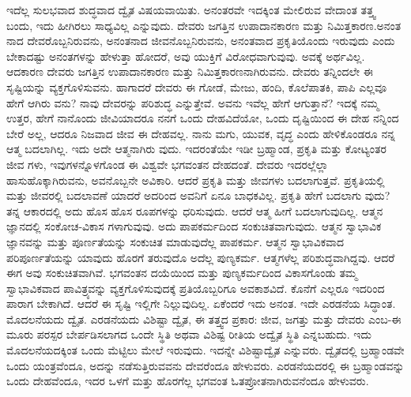 ಇದೆಲ್ಲ ಸುಲಭವಾದ ಶುದ್ಧವಾದ ದ್ವೈತ ವಿಷಯವಾಯಿತು. ಅನಂತರವೇ ಇದಕ್ಕಿಂತ ಮೇಲಿರುವ ವೇದಾಂತ ತತ್ತ್ವ ಬಂದು, ಇದು ಹೀಗಿರಲು ಸಾಧ್ಯವಿಲ್ಲ ಎನ್ನುವುದು. ದೇವರು ಜಗತ್ತಿನ ಉಪಾದಾನಕಾರಣ ಮತ್ತು ನಿಮಿತ್ತಕಾರಣ.ಅನಂತ ನಾದ ದೇವರೊಬ್ಬನಿರುವನು, ಅನಂತನಾದ ಜೀವನೊಬ್ಬನಿರುವನು, ಅನಂತವಾದ ಪ್ರಕೃತಿಯೊಂದು ಇರುವುದು ಎಂದು ಬೇಕಾದಷ್ಟು ಅನಂತಗಳನ್ನು ಹೇಳುತ್ತಾ ಹೋದರೆ, ಅವು ಯುಕ್ತಿಗೆ ವಿರೋಧವಾಗುವುವು. ಅವಕ್ಕೆ ಅರ್ಥವಿಲ್ಲ. ಆದಕಾರಣ ದೇವರು ಜಗತ್ತಿನ ಉಪಾದಾನಕಾರಣ ಮತ್ತು ನಿಮಿತ್ತಕಾರಣನಾಗಿರುವನು. ದೇವರು ತನ್ನಿಂದಲೇ ಈ ಸೃಷ್ಟಿಯನ್ನು ವ್ಯಕ್ತಗೊಳಿಸುವನು. ಹಾಗಾದರೆ ದೇವರು ಈ ಗೋಡೆ, ಮೇಜು, ಹಂದಿ, ಕೊಲೆಪಾತಕಿ, ಪಾಪಿ ಎಲ್ಲವೂ ಹೇಗೆ ಆಗಿರು ವನು? ನಾವು ದೇವರನ್ನು ಪರಿಶುದ್ಧ ಎನ್ನುತ್ತೇವೆ. ಅವನು ಇವೆಲ್ಲ ಹೇಗೆ ಆಗುತ್ತಾನೆ? ಇದಕ್ಕೆ ನಮ್ಮ ಉತ್ತರ, ಹೇಗೆ ನಾನೊಂದು ಜೀವಿಯಾದರೂ ನನಗೆ ಒಂದು ದೇಹವಿದೆಯೋ, ಒಂದು ದೃಷ್ಟಿಯಿಂದ ಈ ದೇಹ ನನ್ನಿಂದ ಬೇರೆ ಅಲ್ಲ, ಆದರೂ ನಿಜವಾದ ಜೀವ ಈ ದೇಹವಲ್ಲ. ನಾನು ಮಗು, ಯುವಕ, ವೃದ್ಧ ಎಂದು ಹೇಳಿಕೊಂಡರೂ ನನ್ನ ಆತ್ಮ ಬದಲಾಗಿಲ್ಲ. ಇದು ಅದೇ ಆತ್ಮನಾಗಿರು ವುದು. ಇದರಂತೆಯೇ ಇಡೀ ಬ್ರಹ್ಮಾಂಡ, ಪ್ರಕೃತಿ ಮತ್ತು ಕೋಟ್ಯಂತರ ಜೀವ ಗಳು, ಇವುಗಳನ್ನೊಳಗೊಂಡ ಈ ವಿಶ್ವವೇ ಭಗವಂತನ ದೇಹದಂತೆ. ದೇವರು ಇದರಲ್ಲೆಲ್ಲಾ ಹಾಸುಹೊಕ್ಕಾಗಿರುವನು, ಅವನೊಬ್ಬನೇ ಅವಿಕಾರಿ. ಆದರೆ ಪ್ರಕೃತಿ ಮತ್ತು ಜೀವಗಳು ಬದಲಾಗುತ್ತವೆ. ಪ್ರಕೃತಿಯಲ್ಲಿ ಮತ್ತು ಜೀವರಲ್ಲಿ ಬದಲಾವಣೆ ಯಾದರೆ ಅದರಿಂದ ಅವನಿಗೆ ಏನೂ ಬಾಧಕವಿಲ್ಲ. ಪ್ರಕೃತಿ ಹೇಗೆ ಬದಲಾಗು ವುದು? ತನ್ನ ಆಕಾರದಲ್ಲಿ ಅದು ಹೊಸ ಹೊಸ ರೂಪಗಳನ್ನು ಧರಿಸುವುದು. ಆದರೆ ಆತ್ಮ ಹೀಗೆ ಬದಲಾಗುವುದಿಲ್ಲ. ಆತ್ಮನ ಜ್ಞಾನದಲ್ಲಿ ಸಂಕೋಚ-ವಿಕಾಸ ಗಳಾಗುವುವು. ಅದು ಪಾಪಕರ್ಮದಿಂದ ಸಂಕುಚಿತವಾಗುವುದು. ಆತ್ಮನ ಸ್ವಾಭಾವಿಕ ಜ್ಞಾನವನ್ನು ಮತ್ತು ಪೂರ್ಣತೆಯನ್ನು ಸಂಕುಚಿತ ಮಾಡುವುದೆಲ್ಲ ಪಾಪಕರ್ಮ. ಆತ್ಮನ ಸ್ವಾಭಾವಿಕವಾದ ಪರಿಪೂರ್ಣತೆಯನ್ನು ಯಾವುದು ಹೊರಗೆ ತರುವುದೊ ಅದೆಲ್ಲ ಪುಣ್ಯಕರ್ಮ. ಆತ್ಮಗಳೆಲ್ಲ ಪರಿಶುದ್ಧವಾಗಿದ್ದವು. ಆದರೆ ಈಗ ಅವು ಸಂಕುಚಿತವಾಗಿವೆ. ಭಗವಂತನ ದಯೆಯಿಂದ ಮತ್ತು ಪುಣ್ಯಕರ್ಮದಿಂದ ವಿಕಾಸಗೊಂಡು ತಮ್ಮ ಸ್ವಾಭಾವಿಕವಾದ ಪಾವಿತ್ರ್ಯವನ್ನು ವ್ಯಕ್ತಗೊಳಿಸುವುದಕ್ಕೆ ಪ್ರತಿಯೊಬ್ಬರಿಗೂ ಅವಕಾಶವಿದೆ. ಕೊನೆಗೆ ಎಲ್ಲರೂ ಇದರಿಂದ ಪಾರಾಗ ಬೇಕಾಗಿದೆ. ಆದರೆ ಈ ಸೃಷ್ಟಿ ಇಲ್ಲಿಗೇ ನಿಲ್ಲುವುದಿಲ್ಲ. ಏಕೆಂದರೆ ಇದು ಅನಂತ. ಇದೇ ಎರಡನೆಯ ಸಿದ್ಧಾಂತ. ಮೊದಲನೆಯದು ದ್ವೈತ. ಎರಡನೆಯದು ವಿಶಿಷ್ಟಾ ದ್ವೈತ, ಈ ತತ್ತ್ವದ ಪ್ರಕಾರ: ಜೀವ, ಜಗತ್ತು ಮತ್ತು ದೇವರು ಎಂಬ-ಈ ಮೂರು ಪರಸ್ಪರ ಬೇರ್ಪಡಿಸಲಾಗದ ಒಂದೇ ಸ್ಥಿತಿ ಅಥವಾ ವಿಶಿಷ್ಟ ರೀತಿಯ ಅದ್ವೈತ ಸ್ಥಿತಿ ಎನ್ನಬಹುದು. ಇದು ಮೊದಲನೆಯದಕ್ಕಿಂತ ಒಂದು ಮೆಟ್ಟಿಲು ಮೇಲೆ ಇರುವುದು. ಇದನ್ನೇ ವಿಶಿಷ್ಟಾದ್ವೈತ ಎನ್ನುವರು. ದ್ವೈತದಲ್ಲಿ ಬ್ರಹ್ಮಾಂಡವೇ ಒಂದು ಯಂತ್ರವೆಂದೂ, ಅದನ್ನು ನಡೆಸುತ್ತಿರುವವನು ದೇವರೆಂದೂ ಹೇಳುವರು. ಎರಡನೆಯದರಲ್ಲಿ ಈ ಬ್ರಹ್ಮಾಂಡವನ್ನು ಒಂದು ದೇಹವೆಂದೂ, ಇದರ ಒಳಗೆ ಮತ್ತು ಹೊರಗೆಲ್ಲ ಭಗವಂತ ಓತಪ್ರೋತನಾಗಿರುವನೆಂದೂ ಹೇಳುವರು.

